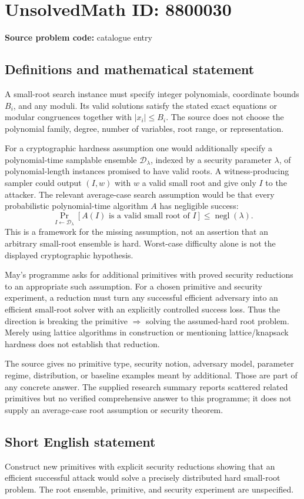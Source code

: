 \documentclass[11pt]{article}
\begin{document}
\section*{UnsolvedMath ID: 8800030}
\textbf{Source problem code:} catalogue entry
\subsection{Definitions and mathematical statement}
A small-root search instance must specify integer polynomials, coordinate bounds \(B_i\), and any moduli. Its valid solutions satisfy the stated exact equations or modular congruences together with \(|x_i|\le B_i\). The source does not choose the polynomial family, degree, number of variables, root range, or representation.

For a cryptographic hardness assumption one would additionally specify a polynomial-time samplable ensemble \(\mathcal D_\lambda\), indexed by a security parameter \(\lambda\), of polynomial-length instances promised to have valid roots. A witness-producing sampler could output \((I,w)\) with \(w\) a valid small root and give only \(I\) to the attacker. The relevant average-case search assumption would be that every probabilistic polynomial-time algorithm \(A\) has negligible success:
\[
\Pr_{I\leftarrow\mathcal D_\lambda}
[A(I)\text{ is a valid small root of }I]\le\operatorname{negl}(\lambda).
\]
This is a framework for the missing assumption, not an assertion that an arbitrary small-root ensemble is hard. Worst-case difficulty alone is not the displayed cryptographic hypothesis.

May's programme asks for additional primitives with proved security reductions to an appropriate such assumption. For a chosen primitive and security experiment, a reduction must turn any successful efficient adversary into an efficient small-root solver with an explicitly controlled success loss. Thus the direction is breaking the primitive \(\Rightarrow\) solving the assumed-hard root problem. Merely using lattice algorithms in construction or mentioning lattice/knapsack hardness does not establish that reduction.

The source gives no primitive type, security notion, adversary model, parameter regime, distribution, or baseline examples meant by additional. Those are part of any concrete answer. The supplied research summary reports scattered related primitives but no verified comprehensive answer to this programme; it does not supply an average-case root assumption or security theorem.
\subsection{Short English statement}
Construct new primitives with explicit security reductions showing that an efficient successful attack would solve a precisely distributed hard small-root problem. The root ensemble, primitive, and security experiment are unspecified.
\end{document}
